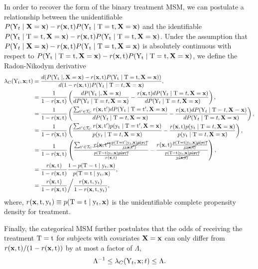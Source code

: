 In order to recover the form of the binary treatment MSM, we can postulate a relationship between the unidentifiable $P(\Y_t \mid \X=\x) - r(\x, \tf) P(\Yt \mid \Tf=\tf, \X=\x)$ and the identifiable $P(\Yt \mid \Tf=\tf, \X=\x) - r(\x, \tf) P(\Yt \mid \Tf=\tf, \X=\x)$. Under the assumption that $P(\Y_t \mid \X=\x) - r(\x, \tf) P(\Yt \mid \Tf=\tf, \X=\x)$ is absolutely continuous with respect to $P(\Yt \mid \Tf=\tf, \X=\x) - r(\x, \tf) P(\Yt \mid \Tf=\tf, \X=\x)$, we define the Radon-Nikodym derivative
\begin{equation}
    \begin{split}
        \lambda_{C}(\Yt, \x; \tf) &= \frac{d(P(\Yt \mid, \X=\x) - r(\x, \tf) P(\Yt \mid \Tf=\tf, \X=\x))}{d (1 - r(\x, \tf)) P(\Y_t \mid \Tf = t, \X=\x)}, \\
        &= \frac{1}{1 - r(\x, \tf)} \left( \frac{dP(\Yt \mid, \X=\x)}{dP(\Y_t \mid \Tf = t, \X=\x)} - \frac{r(\x, \tf)dP(\Y_t \mid \Tf = t, \X=\x)}{dP(\Y_t \mid \Tf = t, \X=\x)} \right), \\
        &= \frac{1}{1 - r(\x, \tf)} \left( \frac{\sum_{\tfp \in \Tcal_{C}} r(\x, \tfp) dP(\Yt \mid \Tf=\tfp, \X=\x)}{dP(\Y_t \mid \Tf = t, \X=\x)} - \frac{r(\x, \tf)dP(\Y_t \mid \Tf = t, \X=\x)}{dP(\Y_t \mid \Tf = t, \X=\x)} \right), \\
        &= \frac{1}{1 - r(\x, \tf)} \left( \frac{\sum_{\tfp \in \Tcal_{C}} r(\x, \tfp) p(\yt \mid \Tf=\tfp, \X=\x)}{p(\y_t \mid \Tf = t, \X=\x)} - \frac{r(\x, \tf)p(\yt \mid \Tf = t, \X=\x)}{p(\yt \mid \Tf = t, \X=\x)} \right), \\
        &= \frac{1}{1 - r(\x, \tf)} \left( \frac{\sum_{\tfp \in \Tcal_{C}} \cancel{r(\x, \tfp)} \frac{p(\Tf=\tfp \mid \yt, \x)\cancel{p(\yt)}}{\cancel{r(\x, \tfp)}}}{\frac{p(\Tf=\tf \mid \yt, \x)\cancel{p(\yt)}}{r(\x, \tf)}} - \frac{r(\x, \tf)\frac{p(\Tf=\tf \mid \yt, \x)\cancel{p(\yt)}}{\cancel{r(\x, \tf)}}}{\frac{p(\Tf=\tf \mid \yt, \x)\cancel{p(\yt)}}{\cancel{r(\x, \tf)}}} \right), \\
        &= \frac{r(\x, \tf)}{1 - r(\x, \tf)} \frac{1 - p(\Tf=\tf \mid \yt, \x)}{p(\Tf=\tf \mid \yt, \x)}, \\
        &= \frac{r(\x, \tf)}{1 - r(\x, \tf)} \bigg{/} \frac{r(\x, \tf, \yt)}{1 - r(\x, \tf, \yt)},
    \end{split}
\end{equation}
where, $r(\x, \tf, \yt) \equiv p(\Tf=\tf \mid \yt, \x)$ is the unidentifiable complete propensity density for treatment.

Finally, the categorical MSM further postulates that the odds of receiving the treatment $\Tf=\tf$ for subjects with covariates $\X=\x$ can only differ from $r(\x, \tf) / (1 - r(\x, \tf))$ by at most a factor of $\Lambda$,
\begin{equation}
    \Lambda^{-1} \leq \lambda_{C}(\Y_t, \x; t) \leq \Lambda.
\end{equation}

